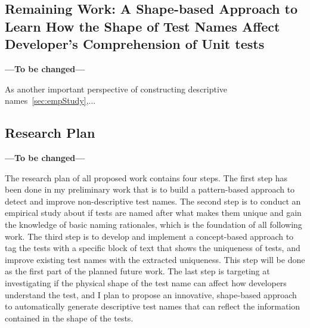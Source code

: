 \subsection{Remaining Work: A Shape-based Approach to Learn How the Shape of Test Names Affect Developer's Comprehension of Unit tests}
\label{sec:remaining-shape}

\textbf{---To be changed---}

As another important perspective of constructing descriptive names~\cref{sec:empStudy},...

\subsection{Research Plan}

\textbf{---To be changed---}

The research plan of all proposed work contains four steps.
%
The first step has been done in my preliminary work that is to build a pattern-based approach to detect and improve non-descriptive test names.
%
The second step is to conduct an empirical study about if tests are named after what makes them unique and gain the knowledge of basic naming rationales, which is the foundation of all following work.
%
The third step is to develop and implement a concept-based approach to tag the tests with a specific block of text that shows the uniqueness of tests, and improve existing test names with the extracted uniqueness.
%
This step will be done as the first part of the planned future work.
%
The last step is targeting at investigating if the physical shape of the test name can affect how developers understand the test, and I plan to propose an innovative, shape-based approach to automatically generate descriptive test names that can reflect the information contained in the shape of the tests.